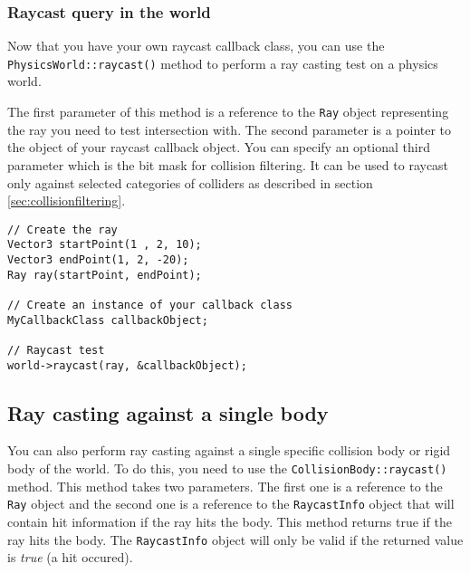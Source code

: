 \documentclass[a4paper,12pt]{article}
\begin{document}
    \subsubsection{Raycast query in the world}

    \begin{sloppypar} 
    Now that you have your own raycast callback class, you can use the \texttt{PhysicsWorld::raycast()} method to perform a ray casting test
    on a physics world. \\
    \end{sloppypar} 

    The first parameter of this method is a reference to the \texttt{Ray} object representing the ray you need to test intersection with. The second parameter is a pointer to
    the object of your raycast callback object. You can specify an optional third parameter which is the bit mask for collision filtering.
    It can be used to raycast only against selected categories of colliders as described in section \ref{sec:collisionfiltering}. \\

    \begin{lstlisting}
// Create the ray
Vector3 startPoint(1 , 2, 10);
Vector3 endPoint(1, 2, -20);
Ray ray(startPoint, endPoint);

// Create an instance of your callback class
MyCallbackClass callbackObject;

// Raycast test
world->raycast(ray, &callbackObject);
    \end{lstlisting}

    \vspace{0.6cm}

    \subsection{Ray casting against a single body}

    \begin{sloppypar}

    You can also perform ray casting against a single specific collision body or rigid body of the world. To do this, you need to use the
    \texttt{CollisionBody::raycast()} method. This method takes two parameters. The first one is a reference to the \texttt{Ray} object and the second one
    is a reference to the \texttt{RaycastInfo} object that will contain hit information if the ray hits the body. This method returns true if the ray hits the
    body. The \texttt{RaycastInfo} object will only be valid if the returned value is \emph{true} (a hit occured). \\

    \end{sloppypar}
\end{document}
